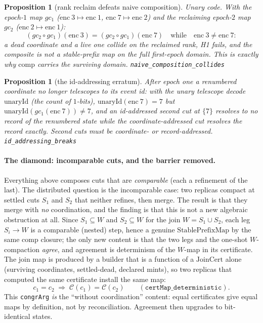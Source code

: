 \documentclass[11pt]{article}
\newtheorem{proposition}[theorem]{Proposition}
\newcommand{\lean}[1]{\texttt{#1}}
\newcommand{\code}[1]{\texttt{#1}}
\begin{document}
\begin{proposition}[rank reclaim defeats naive composition]
\label{prop:rankreclaim}
Unary code. With the epoch-$1$ map $gc_1$ ($\mathrm{enc}\ 3 \mapsto
\mathrm{enc}\ 1$, $\mathrm{enc}\ 7 \mapsto \mathrm{enc}\ 2$) and the
reclaiming epoch-$2$ map $gc_2$ ($\mathrm{enc}\ 2 \mapsto
\mathrm{enc}\ 1$):
\[
  (gc_2 \circ gc_1)(\mathrm{enc}\ 3) = (gc_2 \circ
  gc_1)(\mathrm{enc}\ 7)
  \quad\text{while}\quad \mathrm{enc}\ 3 \neq \mathrm{enc}\ 7 :
\]
a dead coordinate and a live one collide on the reclaimed rank, H1
fails, and the composite is not a stable-prefix map on the full
first-epoch domain. This is exactly why $\mathrm{comp}$ carries the
surviving domain.
\hfill\lean{naive\_composition\_collides}
\end{proposition}

\begin{proposition}[the id-addressing erratum]
\label{prop:idaddr}
After epoch one a renumbered coordinate no longer telescopes to its
event id: with the unary telescope decode $\mathrm{unaryId}$ (the
count of $1$-bits), $\mathrm{unaryId}(\mathrm{enc}\ 7) = 7$ but
$\mathrm{unaryId}(gc_1(\mathrm{enc}\ 7)) \neq 7$, and an id-addressed
second cut at $\{7\}$ resolves to \emph{no} record of the renumbered
state while the coordinate-addressed cut resolves the record exactly.
Second cuts must be coordinate- or record-addressed.
\hfill\lean{id\_addressing\_breaks}
\end{proposition}

\paragraph{The diamond: incomparable cuts, and the barrier removed.}
Everything above composes cuts that are \emph{comparable} (each a
refinement of the last). The distributed question is the incomparable
case: two replicas compact at settled cuts $S_1$ and $S_2$ that neither
refines, then merge. The result is that they merge with \emph{no}
coordination, and the finding is that this is not a new algebraic
obstruction at all. Since $S_1 \subseteq W$ and $S_2 \subseteq W$ for the
join $W = S_1 \cup S_2$, each leg $S_i \to W$ is a comparable (nested)
step, hence a genuine $\mathrm{StablePrefixMap}$ by the same $\mathrm{comp}$
closure; the only new content is that the two legs and the one-shot
$W$-compaction \emph{agree}, and agreement is determinism of the
$W$-map in its certificate. The join map is produced by a builder that
is a function of a $\mathrm{JoinCert}$ alone (surviving coordinates,
settled-dead, declared mints), so two replicas that computed the same
certificate install the same map:
\[
  c_1 = c_2 \;\Rightarrow\; \mathcal{C}(c_1) = \mathcal{C}(c_2)
  \qquad (\lean{certMap\_deterministic}).
\]
This \code{congrArg} \emph{is} the ``without coordination'' content:
equal certificates give equal maps by definition, not by reconciliation.
Agreement then upgrades to bit-identical states.
\end{document}
